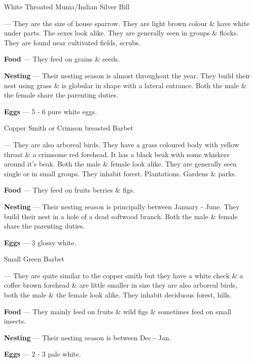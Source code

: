 \begin{bird}{White Throated Munia/Indian Silver Bill}

 --- They are the size of house sparrow. They are light brown colour \& have white under parts. The sexes look alike. They are generally seen in groups \& flocks. They are found near cultivated fields, scrubs. 

{\large\bf Food} --- They feed on grains \& seeds.

{\large\bf Nesting} --- Their nesting season is almost throughout the year. They build their nest using grass \& is globular in shape with a lateral entrance. Both the male \& the female share the parenting duties.

{\large\bf Eggs} --- 5 - 6 pure white eggs.
\end{bird}

\begin{bird}{Copper Smith or Crimson breasted Barbet}

 --- They are also arboreal birds. They have a grass coloured body with yellow throat \& a crimsome red forehead. It has a black beak with some whiskers around it's beak. Both the male \& female look alike. They are generally seen single or in small groups. They inhabit forest. Plantations. Gardens \& parks.

{\large\bf Food} --- They feed on fruits berries \& figs.

{\large\bf Nesting} --- Their nesting season is principally between January - June. They build their nest in a hole of a dead softwood branch. Both the male \& female share the parenting duties.

{\large\bf Eggs} --- 3 glossy white.
\end{bird}

\begin{bird}{Small Green Barbet}

 --- They are quite similar to the copper smith but they have a white check \& a coffee brown forehead \& are little smaller in size they are also arboreal birds, both the male \& the female look alike. They inhabit deciduous forest, hills.

{\large\bf Food} --- They mainly feed on fruits \& wild figs \& sometimes feed on small insects.

{\large\bf Nesting} --- Their nesting season is between Dec - Jan.

{\large\bf Eggs} --- 2 - 3 pale white.
\end{bird}


